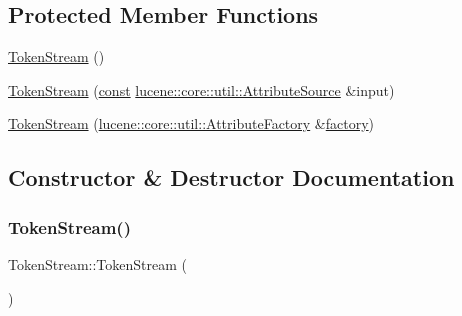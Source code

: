 \subsection*{Protected Member Functions}
\begin{DoxyCompactItemize}
\item 
\mbox{\hyperlink{classlucene_1_1core_1_1analysis_1_1TokenStream_aa9190a1864f989c530aa6c470750d2d8}{Token\+Stream}} ()
\item 
\mbox{\hyperlink{classlucene_1_1core_1_1analysis_1_1TokenStream_a225edeafcbb8da438c1e4ce156357bb6}{Token\+Stream}} (\mbox{\hyperlink{ZlibCrc32_8h_a2c212835823e3c54a8ab6d95c652660e}{const}} \mbox{\hyperlink{classlucene_1_1core_1_1util_1_1AttributeSource}{lucene\+::core\+::util\+::\+Attribute\+Source}} \&input)
\item 
\mbox{\hyperlink{classlucene_1_1core_1_1analysis_1_1TokenStream_ae8358809645d3dff705d514cac50ea17}{Token\+Stream}} (\mbox{\hyperlink{classlucene_1_1core_1_1util_1_1AttributeFactory}{lucene\+::core\+::util\+::\+Attribute\+Factory}} \&\mbox{\hyperlink{classlucene_1_1core_1_1util_1_1AttributeSource_a1376420a752f337a0fdb582bdf160eba}{factory}})
\end{DoxyCompactItemize}


\subsection{Constructor \& Destructor Documentation}
\mbox{\label{classlucene_1_1core_1_1analysis_1_1TokenStream_aa9190a1864f989c530aa6c470750d2d8}} 
\subsubsection{\texorpdfstring{Token\+Stream()}{TokenStream()}\hspace{0.1cm}{\footnotesize\ttfamily [1/3]}}
{\footnotesize\ttfamily Token\+Stream\+::\+Token\+Stream (\begin{DoxyParamCaption}{ }\end{DoxyParamCaption})\hspace{0.3cm}{\ttfamily [protected]}}

\mbox{\label{classlucene_1_1core_1_1analysis_1_1TokenStream_a225edeafcbb8da438c1e4ce156357bb6}} 
